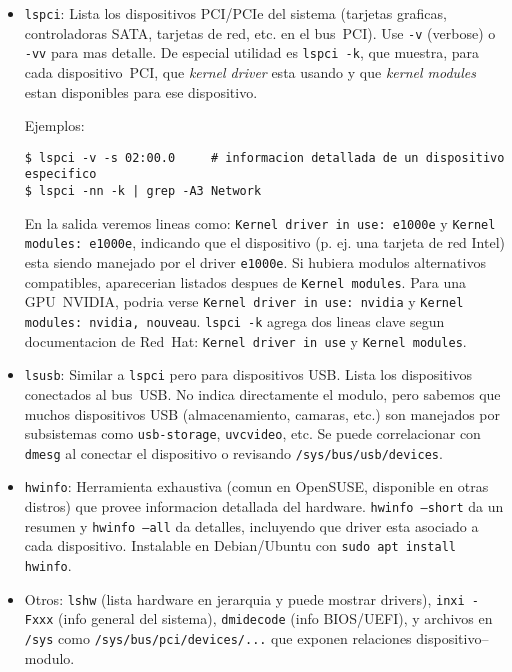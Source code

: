 \begin{itemize}
  \item \texttt{lspci}: Lista los dispositivos PCI/PCIe del sistema (tarjetas graficas, controladoras SATA, tarjetas de red, etc. en el bus~PCI). Use \texttt{-v} (verbose) o \texttt{-vv} para mas detalle. De especial utilidad es \texttt{lspci -k}, que muestra, para cada dispositivo~PCI, que \emph{kernel driver} esta usando y que \emph{kernel modules} estan disponibles para ese dispositivo.

\vspace{0.3em}
Ejemplos:
\begin{lstlisting}
$ lspci -v -s 02:00.0     # informacion detallada de un dispositivo especifico
$ lspci -nn -k | grep -A3 Network
\end{lstlisting}

En la salida veremos lineas como: \texttt{Kernel driver in use: e1000e} y \texttt{Kernel modules: e1000e}, indicando que el dispositivo (p. ej. una tarjeta de red Intel) esta siendo manejado por el driver \texttt{e1000e}. Si hubiera modulos alternativos compatibles, aparecerian listados despues de \texttt{Kernel modules}. Para una GPU~NVIDIA, podria verse \texttt{Kernel driver in use: nvidia} y \texttt{Kernel modules: nvidia, nouveau}. \texttt{lspci -k} agrega dos lineas clave segun documentacion de Red~Hat: \texttt{Kernel driver in use} y \texttt{Kernel modules}.
  \item \texttt{lsusb}: Similar a \texttt{lspci} pero para dispositivos USB. Lista los dispositivos conectados al bus~USB. No indica directamente el modulo, pero sabemos que muchos dispositivos USB (almacenamiento, camaras, etc.) son manejados por subsistemas como \texttt{usb-storage}, \texttt{uvcvideo}, etc. Se puede correlacionar con \texttt{dmesg} al conectar el dispositivo o revisando \texttt{/sys/bus/usb/devices}.
  \item \texttt{hwinfo}: Herramienta exhaustiva (comun en OpenSUSE, disponible en otras distros) que provee informacion detallada del hardware. \texttt{hwinfo --short} da un resumen y \texttt{hwinfo --all} da detalles, incluyendo que driver esta asociado a cada dispositivo. Instalable en Debian/Ubuntu con \texttt{sudo apt install hwinfo}.
  \item Otros: \texttt{lshw} (lista hardware en jerarquia y puede mostrar drivers), \texttt{inxi -Fxxx} (info general del sistema), \texttt{dmidecode} (info BIOS/UEFI), y archivos en \texttt{/sys} como \texttt{/sys/bus/pci/devices/...} que exponen relaciones dispositivo--modulo.
\end{itemize}

